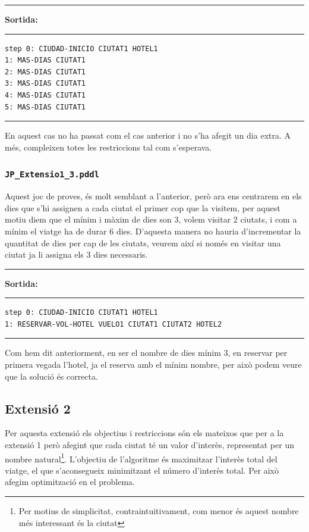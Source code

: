 \documentclass[11pt,a4paper]{article}
\begin{document}
\begin{samepage}
\medskip
\noindent
\rule{0.1\textwidth}{0.5mm}
\textbf{Sortida:}
\rule{0.76\textwidth}{0.5mm}
\begin{verbatim}
step 0: CIUDAD-INICIO CIUTAT1 HOTEL1
1: MAS-DIAS CIUTAT1
2: MAS-DIAS CIUTAT1
3: MAS-DIAS CIUTAT1
4: MAS-DIAS CIUTAT1
5: MAS-DIAS CIUTAT1
\end{verbatim}
\rule{\textwidth}{0.5mm}
\medskip
\end{samepage}

En aquest cas no ha passat com el cas anterior i no s'ha afegit un dia extra. A més, compleixen totes les restriccions tal com s'esperava.

\subsubsection*{\texttt{JP\_Extensio1\_3.pddl}}

Aquest joc de proves, és molt semblant a l'anterior, però ara ens centrarem en els dies que s'hi assignen a cada ciutat el primer cop que la visitem, per aquest motiu diem que el mínim i màxim de dies son 3, volem visitar 2 ciutats, i com a mínim el viatge ha de durar 6 dies. D'aquesta manera no hauria d'incrementar la quantitat de dies per cap de les ciutats, veurem així si només en visitar una ciutat ja li assigna els 3 dies necessaris.

\begin{samepage}
\medskip
\noindent
\rule{0.1\textwidth}{0.5mm}
\textbf{Sortida:}
\rule{0.76\textwidth}{0.5mm}
\begin{verbatim}
step 0: CIUDAD-INICIO CIUTAT1 HOTEL1
1: RESERVAR-VOL-HOTEL VUELO1 CIUTAT1 CIUTAT2 HOTEL2
\end{verbatim}
\rule{\textwidth}{0.5mm}
\medskip
\end{samepage}

Com hem dit anteriorment, en ser el nombre de dies mínim 3, en reservar per primera vegada l'hotel, ja el reserva amb el mínim nombre, per això podem veure que la solució és correcta.

\subsection{Extensió 2}

Per aquesta extensió els objectius i restriccions són els mateixos que per a  la extensió 1 però afegint que cada ciutat té un valor d'interès, representat per un nombre natural\footnote{Per motius de simplicitat, contraintuitivament, com menor és aquest nombre més interessant és la ciutat}. L'objectiu de l'algoritme és maximitzar l'interès total del viatge, el que s'aconsegueix minimitzant el número d'interès total. Per això afegim optimització en el problema. 
\end{document}
